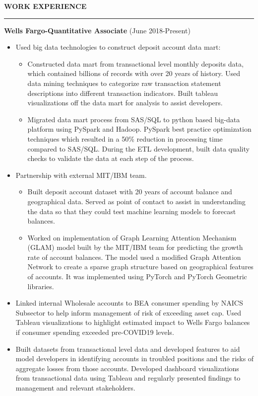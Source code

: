 \documentclass[a4paper,10pt]{article}
\begin{document}
\noindent
\textbf{WORK EXPERIENCE}\vspace{-3mm}\\
\hrule height 2pt
\vspace{2mm}
\textbf{Wells Fargo-Quantitative Associate} (June 2018-Present)
\begin{itemize}
\item Used big data technologies to construct deposit account data mart:
  \begin{itemize}[label=\textbullet]
  \item Constructed data mart from transactional level monthly deposits data, which contained billions of records with over 20 years of history. Used data mining techniques to categorize raw transaction statement descriptions into different transaction indicators. Built tableau visualizations off the data mart for analysis to assist developers.
  \end{itemize}
 \begin{itemize}[label=\textbullet]
  \item Migrated data mart process from SAS/SQL to python based big-data platform using PySpark and Hadoop. 
 PySpark best practice optimization techniques which resulted in a 50\% reduction in processing time compared to SAS/SQL.  During the ETL development, built data quality checks to validate the data at each step of the process. 
  \end{itemize}
\item Partnership with external MIT/IBM team.
 \begin{itemize}[label=\textbullet]
  \item Built deposit account dataset with 20 years of account balance and geographical data. Served as point of contact to assist in understanding the data so that they could test machine learning models to forecast balances.
  \end{itemize}
 \begin{itemize}[label=\textbullet]
  \item Worked on implementation of Graph Learning Attention Mechanism (GLAM) model built by the MIT/IBM team for predicting the growth rate of account balances. The model used a modified Graph Attention Network to create a sparse graph structure based on geographical features of accounts. It was implemented using PyTorch and PyTorch Geometric libraries.
  \end{itemize}
\item Linked internal Wholesale accounts to BEA consumer spending by NAICS Subsector to help inform management of risk of exceeding asset cap. Used Tableau visualizations to highlight estimated impact to Wells Fargo balances if consumer spending exceeded pre-COVID19 levels.
\item Built datasets from transactional level data and developed features to aid model developers in identifying accounts in troubled positions and the risks of aggregate losses from those accounts. Developed dashboard visualizations from transactional data using Tableau and regularly presented findings to management and relevant stakeholders.
\end{itemize}
\end{document}

